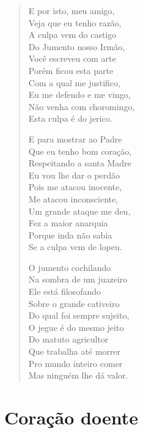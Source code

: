 \begin{verse}
E por isto, meu amigo,\\
Veja que eu tenho razão,\\
A culpa vem do castigo\\
Do Jumento nosso Irmão,\\
Você escreveu com arte\\
Porém ficou esta parte\\
Com a qual me justifico,\\
Eu me defendo e me vingo,\\
Não venha com choromingo,\\
Esta culpa é do jerico.

E para mostrar ao Padre\\
Que eu tenho bom coração,\\
Respeitando a santa Madre\\
Eu vou lhe dar o perdão\\
Pois me atacou inocente,\\
Me atacou inconsciente,\\
Um grande ataque me deu,\\
Fez a maior anarquia\\
Porque inda não sabia\\
Se a culpa vem de lopeu.

O jumento cochilando\\
Na sombra de um juazeiro\\
Ele está filosofando\\
Sobre o grande cativeiro\\
Do qual foi sempre sujeito,\\
O jegue é do mesmo jeito\\
Do matuto agricultor\\
Que trabalha até morrer\\
Pro mundo inteiro comer\\
Mas ninguém lhe dá valor.
\end{verse}

\chapter{Coração doente}

